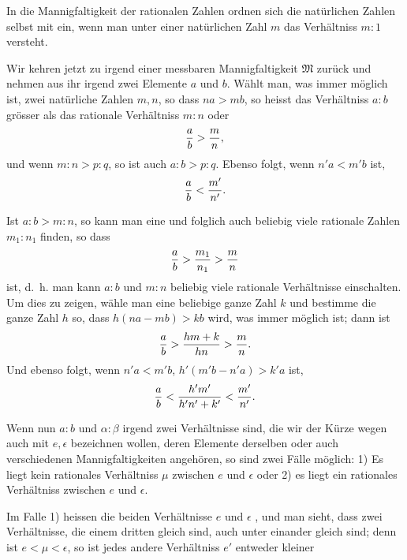 In die Mannigfaltigkeit der rationalen Zahlen ordnen sich die
natürlichen Zahlen selbst mit ein, wenn man unter einer natürlichen
Zahl $m$ das Verhältniss $m:1$ versteht.

Wir kehren jetzt zu irgend einer messbaren Mannigfaltigkeit
$\mathfrak M$ zurück und nehmen aus ihr irgend zwei Elemente $a$ und
$b$. Wählt man, was immer möglich ist, zwei natürliche Zahlen $m,n$,
so dass $na>mb$, so heisst das Verhältniss $a:b$ grösser als das
rationale Verhältniss $m:n$ oder
\[
 {a\over b}>{m\over n},
\]
und wenn $m:n>p:q$, so ist auch $a:b>p:q$. Ebenso folgt, wenn
$n'a<m'b$ ist,
\[
 {a\over b}<{m'\over n'}.
\]

Ist $a:b>m:n$, so kann man eine und folglich auch beliebig viele
rationale Zahlen $m_1:n_1$ finden, so dass
\[
 {a\over b}>{m_1\over n_1}>{m\over n}
\]
ist, d.~h. man kann  $a:b$ und $m:n$ beliebig viele
rationale Verhältnisse einschalten. Um dies zu zeigen, wähle man eine
beliebige ganze Zahl $k$ und bestimme die ganze Zahl $h$ so, dass
$h(na-mb)>kb$ wird, was immer möglich ist; dann ist
\[
 {a\over b}>{hm+k\over hn}>{m\over n}.
\]
Und ebenso folgt, wenn $n'a<m'b$, $h'(m'b-n'a)>k'a$ ist,
\[
 {a\over b}<{h'm'\over h'n'+k'}<{m'\over n'}.
\]

Wenn nun $a:b$ und $\alpha:\beta$ irgend zwei Verhältnisse sind, die
wir der Kürze wegen auch mit $e,\epsilon$ bezeichnen wollen, deren
Elemente derselben oder auch verschiedenen Mannigfaltigkeiten
angehören, so sind zwei Fälle möglich: 1) Es liegt kein rationales
Verhältniss $\mu$ zwischen $e$ und $\epsilon$ oder 2) es liegt ein
rationales Verhältniss zwischen $e$ und $\epsilon$.

Im Falle 1) heissen die beiden Verhältnisse $e$ und $\epsilon$
, und man sieht, dass zwei Verhältnisse, die
einem dritten gleich sind, auch unter einander gleich sind; denn ist
$e<\mu<\epsilon$, so ist jedes andere Verhältniss $e'$ entweder kleiner
